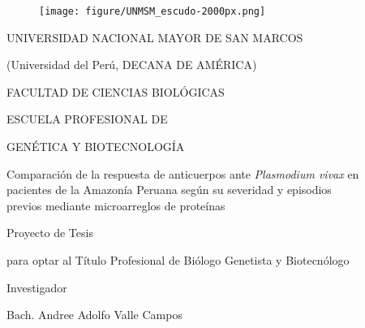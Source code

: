 \documentclass[a4paper]{article}
\title{}
\author{}
\date{}
\begin{document}
\renewcommand{\contentsname}{Índice General} 
\renewcommand{\tablename}{Tabla}
\renewcommand{\tableautorefname}{Tabla}


\clearpage
{}

\begin{centering}

\begin{figure}[!ht]
  \begin{center}
    \texttt{[image: figure/UNMSM\_escudo-2000px.png]}%
  \end{center}
\end{figure}

\Large %
UNIVERSIDAD NACIONAL MAYOR DE SAN MARCOS

\large
(Universidad del Perú, DECANA DE AMÉRICA)

\vspace{.3 cm}

\Large
FACULTAD DE CIENCIAS BIOLÓGICAS

\vspace{.3 cm}

\normalsize
ESCUELA PROFESIONAL DE

GENÉTICA Y BIOTECNOLOGÍA

\vspace{2.8 cm}

\Large
Comparación de la respuesta de anticuerpos ante %
\textit{Plasmodium vivax}
en \\pacientes de la Amazonía Peruana %
según su severidad y episodios \\previos %
mediante microarreglos de proteínas

\vspace{2.8 cm}

\large
Proyecto de Tesis 

para optar al Título Profesional de Biólogo Genetista y Biotecnólogo

\vspace{.3 cm}

\large
Investigador

Bach. Andree Adolfo Valle Campos


\end{centering}
\end{document}
